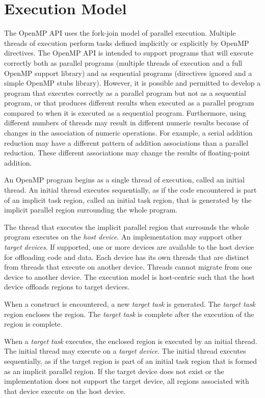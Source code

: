 \section{Execution Model}
\label{sec:Execution Model}
The OpenMP API uses the fork-join model of parallel execution. Multiple threads of
execution perform tasks defined implicitly or explicitly by OpenMP directives. The
OpenMP API is intended to support programs that will execute correctly both as parallel
programs (multiple threads of execution and a full OpenMP support library) and as
sequential programs (directives ignored and a simple OpenMP stubs library). However,
it is possible and permitted to develop a program that executes correctly as a parallel
program but not as a sequential program, or that produces different results when
executed as a parallel program compared to when it is executed as a sequential program.
Furthermore, using different numbers of threads may result in different numeric results
because of changes in the association of numeric operations. For example, a serial
addition reduction may have a different pattern of addition associations than a parallel
reduction. These different associations may change the results of floating-point addition.

An OpenMP program begins as a single thread of execution, called an initial thread. An
initial thread executes sequentially, as if the code encountered is part of an implicit task region, called an
initial task region, that is generated by the implicit parallel region surrounding the whole
program.

The thread that executes the implicit parallel region that surrounds the whole program
executes on the \emph{host device}. An implementation may support
other \emph{target devices}. If
supported, one or more devices are available to the host device for offloading code and
data. Each device has its own threads that are distinct from threads that execute on
another device. Threads cannot migrate from one device to another device. The
execution model is host-centric such that the host device offloads  regions to
target devices.

When a  construct is encountered, a new \emph{target task} is generated.
The \emph{target task} region encloses the  region. The \emph{target task} is
complete after the execution of the  region is complete.

When a \emph{target task} executes, the enclosed  region is executed by an initial
thread.  The initial thread may execute on a \emph{target device}.  The initial thread executes
sequentially, as if the target region is part of an initial task region that is
formed as an implicit parallel region. If the target device does not exist or the implementation does not support the target
device, all  regions associated with that device execute on the host device.


